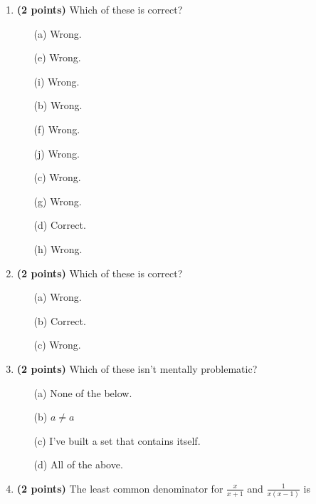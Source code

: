 \documentclass[12pt]{amsart}
\begin{document}
\newpage
\begin{enumerate}
\item {\bf (2 points)} 
 Which of these is correct?

\begin{minipage}[t]{1.0\linewidth}\begin{multicols}{4}\begin{itemize}\item[(a)]  Wrong. \item[(e)]  Wrong. \item[(i)]  Wrong. \item[(b)]  Wrong. \item[(f)]  Wrong. \item[(j)]  Wrong. \item[(c)]  Wrong. \item[(g)]  Wrong. \item[] \item[(d)]  Correct. \item[(h)]  Wrong. \item[] \end{itemize}\end{multicols}\end{minipage} \vfill 
\item {\bf (2 points)} 
 Which of these is correct?

\begin{minipage}[t]{1.0\linewidth}\begin{multicols}{3}\begin{itemize}\item[(a)]  Wrong. \item[(b)]  Correct. \item[(c)]  Wrong. \end{itemize}\end{multicols}\end{minipage} \vfill 
\item {\bf (2 points)} 
 Which of these isn't mentally problematic?

\begin{minipage}[t]{1.0\linewidth}\begin{itemize}\item[(a)]  None of the below.  \item[(b)]  $a \neq a$ \item[(c)]  I've built a set that contains itself. \item[(d)]   All of the above. \end{itemize}\end{minipage} \vfill 
\item {\bf (2 points)} 
 The least common denominator for $\displaystyle \frac{x}{x+1}$ and $\displaystyle \frac{1}{x(x-1)}$ is \vspace{.2cm}


\end{enumerate}
\end{document}
